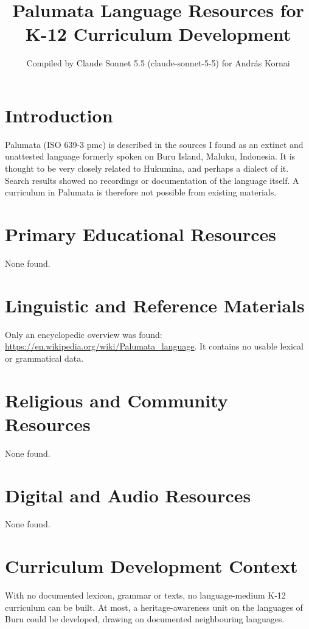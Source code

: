 \documentclass[12pt]{article}
\title{Palumata Language Resources for K-12 Curriculum Development}
\author{Compiled by Claude Sonnet 5.5 (claude-sonnet-5-5) for Andr\'as Kornai}
\date{}
\begin{document}
\maketitle

\section{Introduction}
Palumata (ISO 639-3 pmc) is described in the sources I found as an extinct and unattested language formerly spoken on Buru Island, Maluku, Indonesia. It is thought to be very closely related to Hukumina, and perhaps a dialect of it. Search results showed no recordings or documentation of the language itself. A curriculum in Palumata is therefore not possible from existing materials.

\section{Primary Educational Resources}
None found.

\section{Linguistic and Reference Materials}
Only an encyclopedic overview was found: \url{https://en.wikipedia.org/wiki/Palumata_language}. It contains no usable lexical or grammatical data.

\section{Religious and Community Resources}
None found.

\section{Digital and Audio Resources}
None found.

\section{Curriculum Development Context}
With no documented lexicon, grammar or texts, no language-medium K-12 curriculum can be built. At most, a heritage-awareness unit on the languages of Buru could be developed, drawing on documented neighbouring languages.
\end{document}
